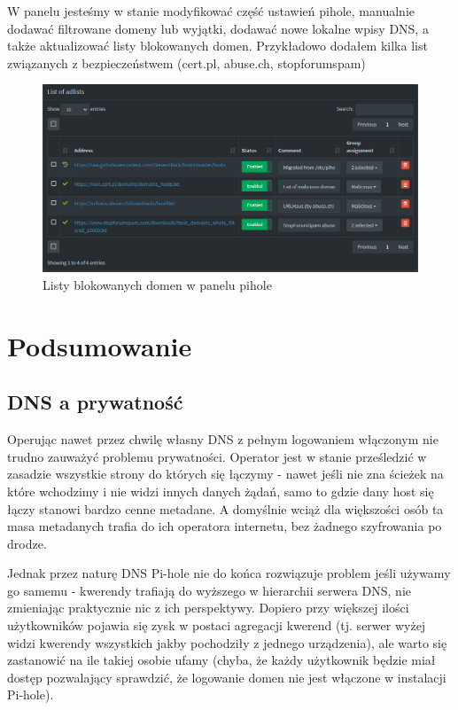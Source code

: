 \documentclass[../main.tex]{subfiles}
\begin{document}
W panelu jesteśmy w stanie modyfikować część ustawień pihole, manualnie dodawać filtrowane domeny lub wyjątki, dodawać nowe lokalne wpisy DNS, a także aktualizować listy blokowanych domen. Przykładowo dodałem kilka list związanych z bezpieczeństwem (cert.pl, abuse.ch, stopforumspam)
\begin{figure}[H]
    \centering
    \includegraphics[scale=0.6]{pihole-adlists.png}
    \caption{Listy blokowanych domen w panelu pihole}
    \label{fig:pihole_adlists}
\end{figure}

\section{Podsumowanie}
\subsection{DNS a prywatność}
Operując nawet przez chwilę własny DNS z pełnym logowaniem włączonym nie trudno zauważyć problemu prywatności. Operator jest w stanie prześledzić w zasadzie wszystkie strony do których się łączymy - nawet jeśli nie zna ścieżek na które wchodzimy i nie widzi innych danych żądań, samo to gdzie dany host się łączy stanowi bardzo cenne metadane. A domyślnie wciąż dla większości osób ta masa metadanych trafia do ich operatora internetu, bez żadnego szyfrowania po drodze.

Jednak przez naturę DNS Pi-hole nie do końca rozwiązuje problem jeśli używamy go samemu - kwerendy trafiają do wyższego w hierarchii serwera DNS, nie zmieniając praktycznie nic z ich perspektywy. Dopiero przy większej ilości użytkowników pojawia się zysk w postaci agregacji kwerend (tj. serwer wyżej widzi kwerendy wszystkich jakby pochodziły z jednego urządzenia), ale warto się zastanowić na ile takiej osobie ufamy (chyba, że każdy użytkownik będzie miał dostęp pozwalający sprawdzić, że logowanie domen nie jest włączone w instalacji Pi-hole).
\end{document}
